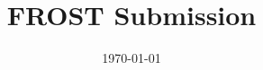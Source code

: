 \documentclass{llncs}
\title{FROST Submission}
\date{\today}
\author{}
\institute{}
\begin{document}
\let\oldaddcontentsline\addcontentsline
\def\addcontentsline#1#2#3{}

	\maketitle


	\begin{abstract}

  \end{abstract}

  \def\addcontentsline#1#2#3{\oldaddcontentsline{#1}{#2}{#3}}
	\onehalfspacing
  \setcounter{tocdepth}{3}
	\tableofcontents
	\singlespacing
	\newpage


%	
	
	

	\printbibliography


\end{document}
